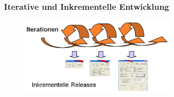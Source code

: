 \begin{frame}
\frametitle{Iterative und Inkrementelle Entwicklung}

\begin{figure}
  \includegraphics[width=0.7\textwidth]{figures/softwarecity_iterativ.png}
  \label{fig:iterativ}
\end{figure}

\end{frame}




